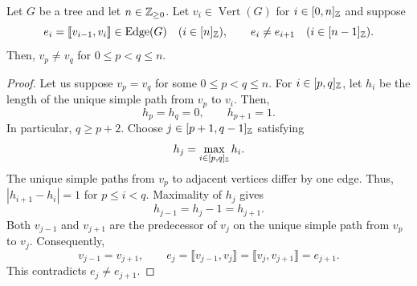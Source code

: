 \begin{lemma}\label{lem:tree-traversal-distinct}
Let $G$ be a tree and let $n\in\mathbb Z_{\ge0}$.
Let $v_i\in\operatorname{Vert}(G)$ for $i\in[0,n]_{\mathbb Z}$ and suppose
\[
 e_i=\llbracket v_{i-1},v_i\rrbracket\in\operatorname{Edge}(G)
 \quad(i\in[n]_{\mathbb Z}),\qquad
 e_i\ne e_{i+1}\quad(i\in[n-1]_{\mathbb Z}).
\]
Then, $v_p\ne v_q$ for $0\le p<q\le n$.
\end{lemma}
\begin{proof}
Let us suppose $v_p=v_q$ for some $0\le p<q\le n$.
For $i\in[p,q]_{\mathbb Z}$, let $h_i$ be the length of the unique simple path from $v_p$ to $v_i$.
Then,
\[
 h_p=h_q=0,\qquad h_{p+1}=1.
\]
In particular, $q\ge p+2$.
Choose $j\in[p+1,q-1]_{\mathbb Z}$ satisfying
\[
 h_j=\max_{i\in[p,q]_{\mathbb Z}}h_i.
\]
The unique simple paths from $v_p$ to adjacent vertices differ by one edge.
Thus, $|h_{i+1}-h_i|=1$ for $p\le i<q$.
Maximality of $h_j$ gives
\[
 h_{j-1}=h_j-1=h_{j+1}.
\]
Both $v_{j-1}$ and $v_{j+1}$ are the predecessor of $v_j$ on the unique simple path from $v_p$ to $v_j$.
Consequently,
\[
 v_{j-1}=v_{j+1},\qquad
 e_j=\llbracket v_{j-1},v_j\rrbracket
 =\llbracket v_j,v_{j+1}\rrbracket=e_{j+1}.
\]
This contradicts $e_j\ne e_{j+1}$.
\end{proof}

